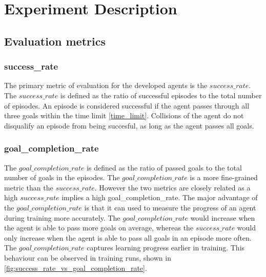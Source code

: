 \chapter{Experiment Description}
\label{cha:Experiments}

\section{Evaluation metrics}

\subsection{success\_rate}
The primary metric of evaluation for the developed agents is the $success\_rate$. The $success\_rate$ is defined as the ratio of successful episodes to the total number of episodes. An episode is considered successful if the agent passes through all three goals within the time limit \ref{time_limit}. Collisions of the agent do not disqualify an episode from being succesful, as long as the agent passes all goals.

\subsection{goal\_completion\_rate}

The $goal\_completion\_rate$ is defined as the ratio of passed goals to the total number of goals in the episodes. The $goal\_completion\_rate$ is a more fine-grained metric than the $success\_rate$. However the two metrics are closely related as a high $success\_rate$ implies a high goal\_completion\_rate. The major advantage of the $goal\_completion\_rate$ is that it can used to measure the progress of an agent during training more accurately.
The $goal\_completion\_rate$ would increase when the agent is able to pass more goals on average, whereas the $success\_rate$ would only increase when the agent is able to pass all goals in an episode more often. The $goal\_completion\_rate$ captures learning progress earlier in training. This behaviour can be observed in training runs, shown in \ref{fig:success_rate_vs_goal_completion_rate}.


